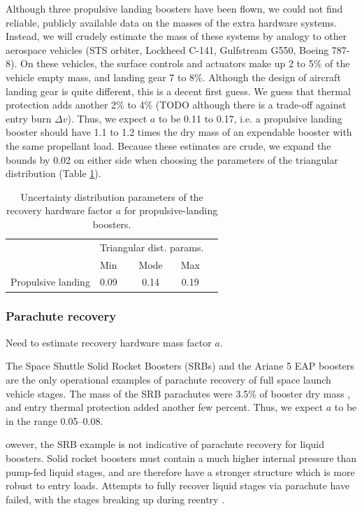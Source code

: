 \documentclass[conf]{../new-aiaa}
\begin{document}
Although three propulsive landing boosters have been flown, we could not find reliable, publicly available data on the masses of the extra hardware systems. Instead, we will crudely estimate the mass of these systems by analogy to other aerospace vehicles (STS orbiter, Lockheed C-141, Gulfstream G550, Boeing 787-8). On these vehicles, the surface controls and actuators make up 2 to 5\% of the vehicle empty mass, and landing gear 7 to 8\%. Although the design of aircraft landing gear is quite different, this is a decent first guess. We guess that thermal protection adds another 2\% to 4\% (TODO although there is a trade-off against entry burn $\Delta v$). Thus, we expect $a$ to be 0.11 to 0.17, i.e. a propulsive landing booster should have 1.1 to 1.2 times the dry mass of an expendable booster with the same propellant load. Because these estimates are crude, we expand the bounds by 0.02 on either side when choosing the parameters of the triangular distribution (Table \ref{tab:propulsive_pref_factor_distributions}).

\begin{table}[hbt!]
    \centering
    \caption{\label{tab:propulsive_pref_factor_distributions} Uncertainty distribution parameters of the recovery hardware factor $a$ for propulsive-landing boosters.}
    \begin{tabular}{l l c c c}
    \hline
     & \multicolumn{3}{c}{Triangular dist. params.} \\
     & Min & Mode & Max \\
    \hline
    \hline
    Propulsive landing  & 0.09 & 0.14 & 0.19 \\
    \hline
    \end{tabular}
\end{table}


\subsubsection{Parachute recovery}
Need to estimate recovery hardware mass factor $a$.

The Space Shuttle Solid Rocket Boosters (SRBs) and the Ariane 5 EAP boosters are the only operational examples of parachute recovery of full space launch vehicle stages. The mass of the SRB parachutes were 3.5\% of booster dry mass \cite{Wolf1996}, and entry thermal protection added another few percent. Thus, we expect $a$ to be in the range \SIrange{0.05}{0.08}{}.

owever, the SRB example is not indicative of parachute recovery for liquid boosters. Solid rocket boosters must contain a much higher internal pressure than pump-fed liquid stages, and are therefore have a stronger structure which is more robust to entry loads. Attempts to fully recover liquid stages via parachute have failed, with the stages breaking up during reentry \cite{Spencer2011}.
\end{document}
